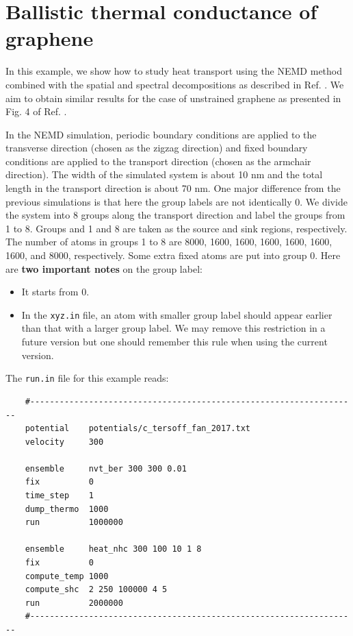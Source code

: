 \documentclass[12pt,a4paper]{report}
\begin{document}
\section{Ballistic thermal conductance of graphene}

In this example, we show how to study heat transport using the NEMD method combined with the spatial and spectral decompositions as described in Ref. \cite{fan2017prb}. We aim to obtain similar results for the case of unstrained graphene as presented in Fig. 4 of Ref. \cite{fan2017prb}.

In the NEMD simulation, periodic boundary conditions are applied to the transverse direction (chosen as the zigzag direction) and fixed boundary conditions are applied to the transport direction (chosen as the armchair direction). The width of the simulated system is about 10 nm and the total length in the transport direction is about 70 nm. One major difference from the previous simulations is that here the group labels are not identically 0. We divide the system into 8 groups along the transport direction and label the groups from 1 to 8. Groups and 1 and 8 are taken as the source and sink regions, respectively. The number of atoms in groups 1 to 8 are 8000, 1600, 1600, 1600, 1600, 1600, 1600, and 8000, respectively. Some extra fixed atoms are put into group 0. Here are \textbf{two important notes} on the group label:
\begin{itemize}
\item It starts from 0.
\item In the \verb"xyz.in" file, an atom with smaller group label should appear earlier than that with a larger group label. We may remove this restriction in a future version but one should remember this rule when using the current version.
\end{itemize}

The \verb"run.in" file for this example reads:
\begin{verbatim}
    #-------------------------------------------------------------------
    potential    potentials/c_tersoff_fan_2017.txt
    velocity     300

    ensemble     nvt_ber 300 300 0.01
    fix          0
    time_step    1
    dump_thermo  1000
    run          1000000

    ensemble     heat_nhc 300 100 10 1 8
    fix          0
    compute_temp 1000
    compute_shc  2 250 100000 4 5
    run          2000000
    #-------------------------------------------------------------------
\end{verbatim}
\end{document}

